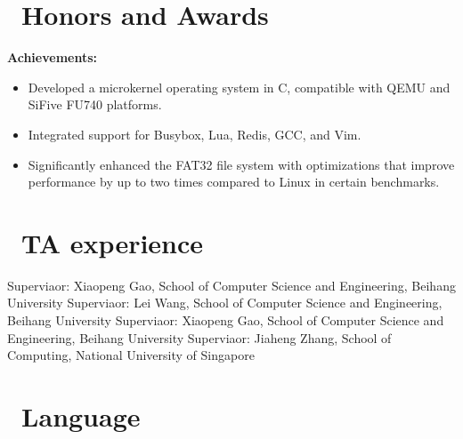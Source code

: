 \documentclass{resume}
\begin{document}
\section{\faTrophy\ Honors and Awards}


\textbf{Achievements:}
\begin{itemize}
  \item Developed a microkernel operating system in C, compatible with QEMU and SiFive FU740 platforms.
  \item Integrated support for Busybox, Lua, Redis, GCC, and Vim.
  \item Significantly enhanced the FAT32 file system with optimizations that improve performance by up to two times compared to Linux in certain benchmarks.
\end{itemize}



\section{\faHeartO\ TA experience}
Superviaor: Xiaopeng Gao, School of Computer Science and Engineering, Beihang University
Superviaor: Lei Wang, School of Computer Science and Engineering, Beihang University
Superviaor: Xiaopeng Gao, School of Computer Science and Engineering, Beihang University
Superviaor: Jiaheng Zhang, School of Computing, National University of Singapore


\section{\faCertificate\ Language}


%
%
\end{document}
